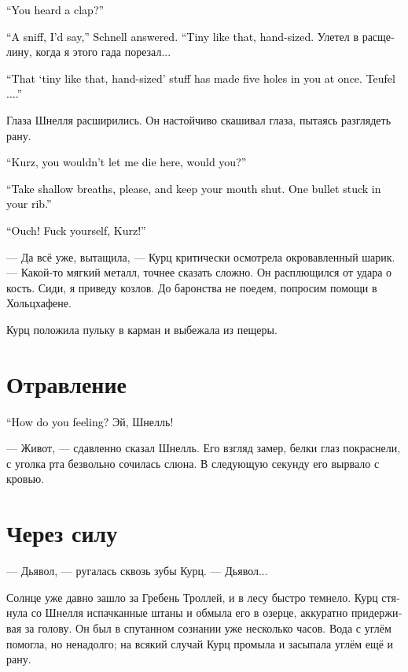 \documentclass[a4paper,12pt,fleqn]{book}\usepackage{cooltooltips}\usepackage{polyglossia}\setdefaultlanguage[babelshorthands=true]{russian}\setotherlanguage{english}\defaultfontfeatures{Ligatures=TeX,Mapping=tex-text} \usepackage{xcolor}\definecolor{lightgray}{HTML}{bbbbbb}\color{lightgray}\newcommand{\ml}[3]{\textenglish{\textcolor{black}{#3}}}
\begin{document}
\ml{$0$}
{--- Он хлопнул?}
{``You heard a clap?''}

\ml{$0$}
{--- Скорее фыркнул, --- задумался Шнелль.}
{``A sniff, I'd say,'' Schnell answered.}
\ml{$0$}
{--- Вот такой маленький, размером с ладошку.}
{``Tiny like that, hand-sized.}
Улетел в расщелину, когда я этого гада порезал...

\ml{$0$}
{--- Этот <<маленький, размером с ладошку>> понаделал в тебе пять дырок одним залпом.}
{``That `tiny like that, hand-sized' stuff has made five holes in you at once.}
\ml{$0$}
{Дьявол...}
{Teufel ....''}

Глаза Шнелля расширились.
Он настойчиво скашивал глаза, пытаясь разглядеть рану.

\ml{$0$}
{--- Курц, ты же не дашь мне сдохнуть здесь, правда?}
{``Kurz, you wouldn't let me die here, would you?''}

\ml{$0$}
{--- Дыши мелкими глотками, пожалуйста, и заткнись.}
{``Take shallow breaths, please, and keep your mouth shut.}
\ml{$0$}
{Одна пулька застряла в ребре.}
{One bullet stuck in your rib.''}

\ml{$0$}
{--- Ай!}
{``Ouch!}
\ml{$0$}
{Чёрт бы тебя побрал, Курц!}
{Fuck yourself, Kurz!''}

--- Да всё уже, вытащила, --- Курц критически осмотрела окровавленный шарик.
--- Какой-то мягкий металл, точнее сказать сложно.
Он расплющился от удара о кость.
Сиди, я приведу козлов.
До баронства не поедем, попросим помощи в Хольцхафене.

Курц положила пульку в карман и выбежала из пещеры.

\section{Отравление}

\ml{$0$}
{--- Как ты себя чувствуешь?}
{``How do you feeling?}
Эй, Шнелль!

--- Живот, --- сдавленно сказал Шнелль.
Его взгляд замер, белки глаз покраснели, с уголка рта безвольно сочилась слюна.
В следующую секунду его вырвало с кровью.

\section{Через силу}

--- Дьявол, --- ругалась сквозь зубы Курц.
--- Дьявол...

Солнце уже давно зашло за Гребень Троллей, и в лесу быстро темнело.
Курц стянула со Шнелля испачканные штаны и обмыла его в озерце, аккуратно придерживая за голову.
Он был в спутанном сознании уже несколько часов.
Вода с углём помогла, но ненадолго;
на всякий случай Курц промыла и засыпала углём ещё и рану.
\end{document}
